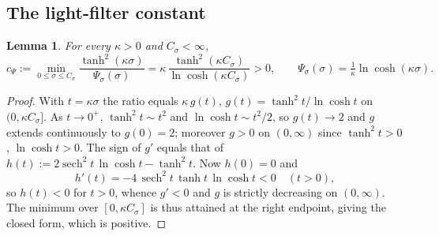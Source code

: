 \documentclass[11pt,a4paper]{article}
\newcommand{\sech}{\operatorname{sech}}
\newcommand{\Psis}{\Psi_\sigma}
\theoremstyle{plain}
\newtheorem{lemma}{Lemma}
\theoremstyle{definition}
\theoremstyle{remark}
\begin{document}
\subsection{The light-filter constant}
\begin{lemma}\label{lem:cpsi}
For every $\kappa>0$ and $C_\sigma<\infty$,
\begin{equation}
  c_\Psi:=\min_{0\le\sigma\le C_\sigma}
  \frac{\tanh^2(\kappa\sigma)}{\Psis(\sigma)}
  =\kappa\,\frac{\tanh^2(\kappa C_\sigma)}{\ln\cosh(\kappa C_\sigma)}>0,
  \qquad
  \Psis(\sigma)=\tfrac1\kappa\ln\cosh(\kappa\sigma).
\end{equation}
\end{lemma}
\begin{proof}
With $t=\kappa\sigma$ the ratio equals $\kappa\,g(t)$,
$g(t)=\tanh^2t/\ln\cosh t$ on $(0,\kappa C_\sigma]$. As $t\to0^+$,
$\tanh^2t\sim t^2$ and $\ln\cosh t\sim t^2/2$, so $g(t)\to2$ and $g$ extends
continuously to $g(0)=2$; moreover $g>0$ on $(0,\infty)$ since
$\tanh^2t>0$, $\ln\cosh t>0$. The sign of $g'$ equals that of
$h(t):=2\sech^2t\,\ln\cosh t-\tanh^2t$. Now $h(0)=0$ and
\begin{equation}
  h'(t)=-4\,\sech^2t\,\tanh t\,\ln\cosh t<0\quad(t>0),
\end{equation}
so $h(t)<0$ for $t>0$, whence $g'<0$ and $g$ is strictly decreasing on
$(0,\infty)$. The minimum over $[0,\kappa C_\sigma]$ is thus attained at the
right endpoint, giving the closed form, which is positive.
\end{proof}
\end{document}
